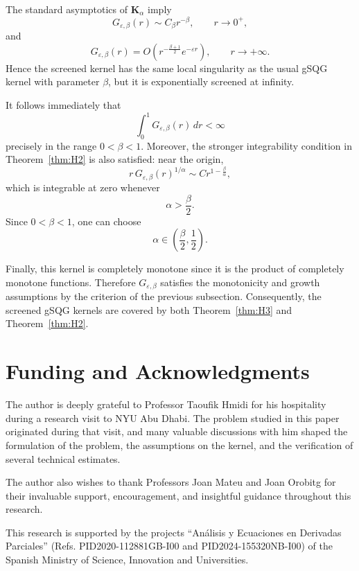 \documentclass[a4paper]{amsart}
\theoremstyle{definition}
\begin{document}
The standard asymptotics of \(\mathbf{K}_{\alpha}\) imply
\[
    G_{\varepsilon,\beta}(r)\sim C_\beta r^{-\beta},
    \qquad r\to0^+,
\]
and
\[
    G_{\varepsilon,\beta}(r)
    =
    O\left(
        r^{-\frac{\beta+1}{2}}e^{-\varepsilon r}
    \right),
    \qquad r\to+\infty.
\]
Hence the screened kernel has the same local singularity as the usual gSQG kernel with parameter \(\beta\), but it is exponentially screened at infinity.

It follows immediately that
\[
    \int_0^1 G_{\varepsilon,\beta}(r)\,dr<\infty
\]
precisely in the range \(0<\beta<1\). Moreover, the stronger integrability condition in Theorem~\ref{thm:H2} is also satisfied: near the origin,
\[
    r\,G_{\varepsilon,\beta}(r)^{1/\alpha}
    \sim
    C r^{1-\frac{\beta}{\alpha}},
\]
which is integrable at zero whenever
\[
    \alpha>\frac{\beta}{2}.
\]
Since \(0<\beta<1\), one can choose
\[
    \alpha\in\left(\frac{\beta}{2},\frac12\right).
\]

Finally, this kernel is completely monotone since it is the product of completely monotone functions. Therefore \(G_{\varepsilon,\beta}\) satisfies the monotonicity and growth assumptions by the criterion of the previous subsection. Consequently, the screened gSQG kernels are covered by both Theorem~\ref{thm:H3} and Theorem~\ref{thm:H2}.


        \section*{Funding and Acknowledgments}
        The author is deeply grateful to Professor Taoufik Hmidi for his hospitality during a research visit to NYU Abu Dhabi. The problem studied in this paper originated during that visit, and many valuable discussions with him shaped the formulation of the problem, the assumptions on the kernel, and the verification of several technical estimates.
        
        The author also wishes to thank Professors Joan Mateu and Joan Orobitg for their invaluable support, encouragement, and insightful guidance throughout this research.
        
        This research is supported by the projects ``Análisis y Ecuaciones en Derivadas Parciales'' (Refs. PID2020-112881GB-I00 and PID2024-155320NB-I00) of the Spanish Ministry of Science, Innovation and Universities.
        
         
          
    
\end{document}

